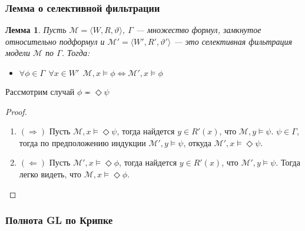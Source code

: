 \documentclass[pdf,utf8,russian,aspectratio=169]{beamer}
\newtheorem{lem}{Лемма}
\begin{document}
\begin{frame}
    \frametitle{Лемма о селективной фильтрации}

    \begin{lem}
      Пусть $\mathcal{M} = \langle W, R, \vartheta \rangle$, $\Gamma$ --- множество формул, замкнутое относительно подформул и
      $\mathcal{M}' = \langle W', R', \vartheta' \rangle$ --- это селективная фильтрация модели $\mathcal{M}$ по $\Gamma$. Тогда:

      \begin{itemize}
        \item $\forall \phi \in \Gamma \:\: \forall x \in W' \:\: \mathcal{M}, x \models \phi \Leftrightarrow \mathcal{M}', x \models \phi$
      \end{itemize}
    \end{lem}
Рассмотрим случай $\phi \eqcirc \Diamond \psi$
    \begin{proof}
      \begin{enumerate}
      \item $(\Rightarrow)$ Пусть $\mathcal{M}, x \models \Diamond \psi$, тогда найдется $y \in R'(x)$, что $\mathcal{M}, y \models \psi$. $\psi \in \Gamma$, тогда
      по предположению индукции $\mathcal{M}', y \models \psi$, откуда $\mathcal{M}', x \models \Diamond \psi$.
      \item $(\Leftarrow)$ Пусть $\mathcal{M}', x \models \Diamond \phi$, тогда найдется $y \in R'(x)$, что $\mathcal{M}', y \models \psi$. Тогда легко видеть, что
      $\mathcal{M}, x \models \Diamond \phi$.
    \end{enumerate}
    \end{proof}
\end{frame}

\begin{frame}
  \frametitle{Полнота {\bf GL} по Крипке}
\end{frame}
\end{document}
